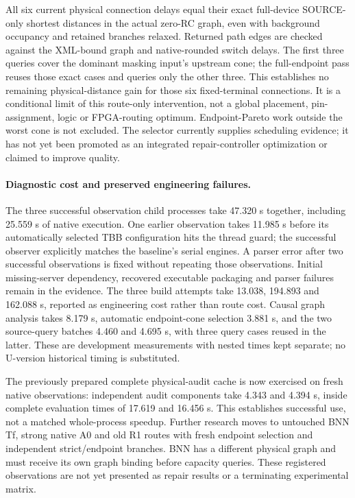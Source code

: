 All six current physical connection delays equal their exact full-device SOURCE-only shortest distances in the actual zero-RC graph, even with background occupancy and retained branches relaxed. Returned path edges are checked against the XML-bound graph and native-rounded switch delays. The first three queries cover the dominant masking input's upstream cone; the full-endpoint pass reuses those exact cases and queries only the other three. This establishes no remaining physical-distance gain for those six fixed-terminal connections. It is a conditional limit of this route-only intervention, not a global placement, pin-assignment, logic or FPGA-routing optimum. Endpoint-Pareto work outside the worst cone is not excluded. The selector currently supplies scheduling evidence; it has not yet been promoted as an integrated repair-controller optimization or claimed to improve quality.

\paragraph{Diagnostic cost and preserved engineering failures.}
The three successful observation child processes take 47.320 s together, including 25.559 s of native execution. One earlier observation takes 11.985 s before its automatically selected TBB configuration hits the thread guard; the successful observer explicitly matches the baseline's serial engines. A parser error after two successful observations is fixed without repeating those observations. Initial missing-server dependency, recovered executable packaging and parser failures remain in the evidence. The three build attempts take 13.038, 194.893 and 162.088 s, reported as engineering cost rather than route cost. Causal graph analysis takes 8.179 s, automatic endpoint-cone selection 3.881 s, and the two source-query batches 4.460 and 4.695 s, with three query cases reused in the latter. These are development measurements with nested times kept separate; no U-version historical timing is substituted.

The previously prepared complete physical-audit cache is now exercised on fresh native observations: independent audit components take 4.343 and 4.394 s, inside complete evaluation times of 17.619 and 16.456 s. This establishes successful use, not a matched whole-process speedup. Further research moves to untouched BNN Tf, strong native A0 and old R1 routes with fresh endpoint selection and independent strict/endpoint branches. BNN has a different physical graph and must receive its own graph binding before capacity queries. These registered observations are not yet presented as repair results or a terminating experimental matrix.
